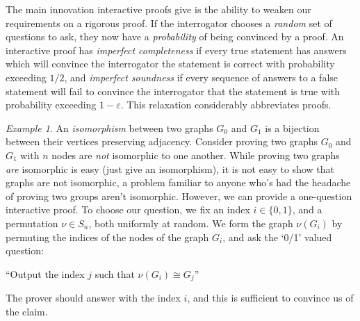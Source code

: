\documentclass{article}
\theoremstyle{plain}
\theoremstyle{remark}
\newtheorem*{example}{Example}
\theoremstyle{definition}
\begin{document}
\begin{multicols}{2}
The main innovation interactive proofs give is the ability to weaken our requirements on a rigorous proof. If the interrogator chooses a {\it random} set of questions to ask, they now have a {\it probability} of being convinced by a proof. An interactive proof has {\it imperfect completeness} if every true statement has answers which will convince the interrogator the statement is correct with probability exceeding $1/2$, and {\it imperfect soundness} if every sequence of answers to a false statement will fail to convince the interrogator that the statement is true with probability exceeding $1 - \varepsilon$. This relaxation considerably abbreviates proofs.

\begin{example}
    An {\it isomorphism} between two graphs $G_0$ and $G_1$ is a bijection between their vertices preserving adjacency. Consider proving two graphs $G_0$ and $G_1$ with $n$ nodes are {\it not} isomorphic to one another. While proving two graphs {\it are} isomorphic is easy (just give an isomorphism), it is not easy to show that graphs are not isomorphic, a problem familiar to anyone who's had the headache of proving two groups aren't isomorphic. However, we can provide a one-question interactive proof. To choose our question, we fix an index $i \in \{ 0, 1 \}$, and a permutation $\nu \in S_n$, both uniformly at random. We form the graph $\nu(G_i)$ by permuting the indices of the nodes of the graph $G_i$, and ask the `0/1' valued question:
%
\begin{center}
    ``Output the index $j$ such that $\nu(G_i) \cong G_j$''
\end{center}
%
The prover should answer with the index $i$, and this is sufficient to convince us of the claim.

\begin{center}
\end{center}
\end{example}
\end{multicols}
\end{document}
